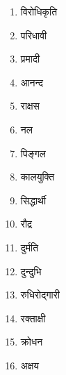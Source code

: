 \begin{multicols}{2}
\begin{enumerate}
\item विरोधिकृति %
\item परिधावी %
\item प्रमादी %
\item आनन्द %
\item राक्षस %
\item नल %
\item पिङ्गल %
\item कालयुक्ति %
\item सिद्धार्थी %
\item रौद्र %
\item दुर्मति %
\item दुन्दुभि %
\item रुधिरोद्गारी %
\item रक्ताक्षी %
\item क्रोधन %
\item अक्षय %
\end{enumerate}
\end{multicols}
